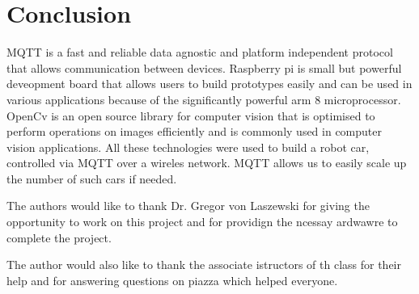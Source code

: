 \documentclass[sigconf]{acmart}
\begin{document}
\section{Conclusion}
MQTT is a fast and reliable data agnostic and platform independent protocol that allows communication between devices. Raspberry pi is small but powerful deveopment board that allows users to build prototypes easily and can be used in various applications because of the significantly powerful arm 8 microprocessor. OpenCv is an open source library for computer vision that is optimised to perform operations on images efficiently and is commonly used in computer vision applications. All these technologies were used to build a robot car, controlled via MQTT over a wireles network. MQTT allows us to easily scale up the number of such cars if needed.

\begin{acks}

  The authors would like to thank Dr. Gregor von Laszewski for giving the opportunity to work on this project and for providign the ncessay ardwawre to complete the project.
  
  The author would also like to thank the associate istructors of th class for their help and for answering questions on piazza which helped everyone.

\end{acks}


 

\appendix




\end{document}
